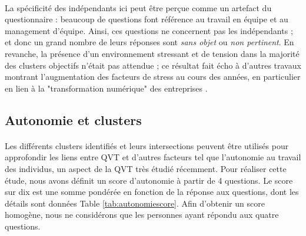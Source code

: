 \documentclass[11pt,fleqn,openany,frenchb]{book} %
\begin{document}
\paragraph{}
La spécificité des indépendants ici peut être perçue comme un artefact du questionnaire : beaucoup de questions font référence au travail en équipe et au management d'équipe. Ainsi, ces questions ne concernent pas les indépendants ; et donc un grand nombre de leurs réponses sont {\em sans objet} ou {\em non pertinent}. En revanche, la présence d'un environnement stressant et de tension dans la majorité des clusters objectifs n'était pas attendue ;  ce résultat fait écho à d'autres travaux montrant l'augmentation des facteurs de stress au cours des années, en particulier en lien à la "transformation numérique" des entreprises \cite{datchary2011dispersion}.

\subsection{Autonomie et clusters}
\paragraph{}
Les différents clusters identifiés et leurs intersections peuvent être utilisés pour approfondir les liens entre QVT et d'autres facteurs tel que l'autonomie au travail des individus, un aspect de la QVT très étudié récemment.
Pour réaliser cette étude, nous avons définit un score d'autonomie à partir de 4 questions. Le score sur dix est une somme pondérée en fonction de la réponse aux questions, dont les détails sont données Table \ref{tab:autonomiescore}. Afin d'obtenir un score homogène, nous ne considérons que les personnes ayant répondu aux quatre questions. 
\end{document}
